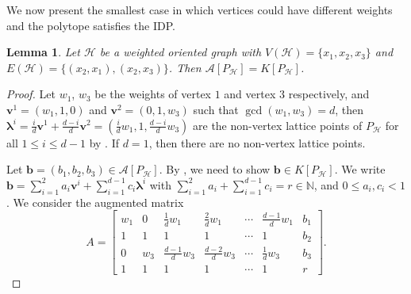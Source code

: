 \documentclass [12pt,a4paper,reqno]{amsart}
\theoremstyle{plain}
\newtheorem{Lemma}[Theorem]{Lemma}
\theoremstyle{definition}
\newtheorem{Assumptions and Discussion}[Theorem]{Assumptions and Discussion}
\theoremstyle{remark}
\newcommand\bfb{\mathbf{b}}
\newcommand\bflam{\boldsymbol{\lambda}}
\newcommand\calA{\mathcal{A}}
\newcommand\calH{\mathcal{H}}
\begin{document}
We now present the smallest case in which vertices could have different weights and the polytope satisfies the IDP.

\begin{Lemma} \label{3VNormal}
Let $\calH$ be a weighted oriented graph with $V(\calH)=\{x_1,x_2,x_3\}$ and $E(\calH)=\{(x_2,x_1),(x_2,x_3)\}$. Then $\calA[P_\calH]=K[P_\calH]$.
\end{Lemma}

\begin{proof}
Let $w_1$, $w_3$ be the weights of vertex $1$ and vertex $3$ respectively, and $\mathbf{v}^{1}=(w_1,1,0)$ and $\mathbf{v}^{2}=(0,1,w_3)$
such that $\gcd(w_1,w_3)=d$, then $\bflam^{i}=\frac{i}{d}\mathbf{v}^{1}+\frac{d-i}{d}\mathbf{v}^{2}=(\frac{i}{d}w_1,1,\frac{d-i}{d}w_3)$
are the non-vertex lattice points of $P_\calH$ for all $1\leq i\leq d-1$ by .  If $d=1$, then there are no non-vertex lattice points. 

Let $\mathbf{b}=(b_{1},b_{2},b_{3})\in \calA[P_{\calH}]$. By , we need to show $\bfb\in K[P_{\calH}]$.
We write $\mathbf{b}=\sum_{i=1}^{2}a_{i}\mathbf{v}^{i}+\sum_{i=1}^{d-1}c_{i}\bflam^i$ with
$\sum_{i=1}^{2}a_{i}+\sum_{i=1}^{d-1}c_{i}=r\in\mathbb{N}$,
and $0\leq a_{i},c_{i}<1$. We consider the augmented matrix
\[
A=\left[\begin{array}{cccccc|c}
w_1 & 0 & \frac{1}{d}w_1 & \frac{2}{d}w_1 & \cdots & \frac{d-1}{d}w_1 & b_{1}\\
1 & 1 & 1 & 1 & \cdots & 1 & b_{2}\\
0 & w_3 & \frac{d-1}{d}w_3 & \frac{d-2}{d}w_3 & \cdots & \frac{1}{d}w_3 & b_{3}\\
1 & 1 & 1 & 1 & \cdots & 1 & r
\end{array}\right].
\]


\end{proof}
\end{document}
